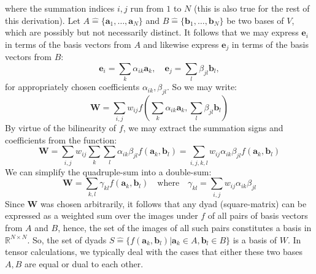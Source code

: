 where the summation indices $i,j$ run from $1$ to $N$ (this is also true for the rest of this derivation). Let $A \hat{=} \{\mathbf{a}_1, \ldots, \mathbf{a}_N\}$ and $B \hat{=} \{\mathbf{b}_1, \ldots, \mathbf{b}_N\}$ be two bases of $V$, which are possibly but not necessarily distinct. It follows that we may express $\mathbf{e}_i$ in terms of the basis vectors from $A$ and likewise express $\mathbf{e}_j$ in terms of the basis vectors from $B$:
\begin{equation}
 \mathbf{e}_i = \sum_{k} \alpha_{ik} \mathbf{a}_k, \quad
 \mathbf{e}_j = \sum_{l} \beta_{jl}  \mathbf{b}_l,
\end{equation}
for appropriately chosen coefficients $\alpha_{ik}, \beta_{jl}$. So we may write:
\begin{equation}
 \mathbf{W} = \sum_{i,j} w_{ij} f(\sum_{k} \alpha_{ik} \mathbf{a}_k, \sum_{l} \beta_{jl} \mathbf{b}_l)
\end{equation}
By virtue of the bilinearity of $f$, we may extract the summation signs and coefficients from the function:
\begin{equation}
 \mathbf{W} = \sum_{i,j} w_{ij} \sum_{k} \sum_{l} \alpha_{ik} \beta_{jl} f(\mathbf{a}_k, \mathbf{b}_l)
            = \sum_{i,j,k,l} w_{ij} \alpha_{ik} \beta_{jl} f(\mathbf{a}_k, \mathbf{b}_l)
\end{equation}
We can simplify the quadruple-sum into a double-sum:
\begin{equation}
 \mathbf{W} = \sum_{k,l} \gamma_{kl} f(\mathbf{a}_k, \mathbf{b}_l)
 \quad \text{where} \quad 
 \gamma_{kl} = \sum_{i,j} w_{ij} \alpha_{ik} \beta_{jl}
\end{equation}
Since $\mathbf{W}$ was chosen arbitrarily, it follows that any dyad (square-matrix) can be expressed as a weighted sum over the images under $f$ of all pairs of basis vectors from $A$ and $B$, hence, the set of the images of all such pairs constitutes a basis in $\mathbb{R}^{N \times N}$. So, the set of dyads $S \hat{=} \{ f(\mathbf{a}_k, \mathbf{b}_l) | \mathbf{a}_k \in A, \mathbf{b}_l \in B\}$ is a basis of $W$. In tensor calculations, we typically deal with the cases that either these two bases $A, B$ are equal or dual to each other.


\normalsize


